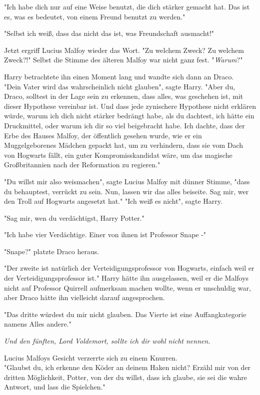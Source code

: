 {"Ich habe dich nur auf eine Weise benutzt, die dich stärker gemacht hat. Das ist es, was es bedeutet, von einem Freund benutzt zu werden."

"Selbst ich weiß, dass das nicht das ist, was Freundschaft ausmacht!"

Jetzt ergriff Lucius Malfoy wieder das Wort. "Zu welchem Zweck? Zu welchem Zweck?!" Selbst die Stimme des älteren Malfoy war nicht ganz fest. "\emph{Warum}?"

Harry betrachtete ihn einen Moment lang und wandte sich dann an Draco.\\ "Dein Vater wird das wahrscheinlich nicht glauben", sagte Harry. "Aber du, Draco, solltest in der Lage sein zu erkennen, dass alles, was geschehen ist, mit dieser Hypothese vereinbar ist. Und dass jede zynischere Hypothese nicht erklären würde, warum ich dich nicht stärker bedrängt habe, als du dachtest, ich hätte ein Druckmittel, oder warum ich dir so viel beigebracht habe. Ich dachte, dass der Erbe des Hauses Malfoy, der öffentlich gesehen wurde, wie er ein Muggelgeborenes Mädchen gepackt hat, um zu verhindern, dass sie vom Dach von Hogwarts fällt, ein guter Kompromisskandidat wäre, um das magische Großbritannien nach der Reformation zu regieren."

"Du willst mir also weismachen", sagte Lucius Malfoy mit dünner Stimme, "dass du behauptest, verrückt zu sein. Nun, lassen wir das alles beiseite. Sag mir, wer den Troll auf Hogwarts angesetzt hat." "Ich weiß es nicht", sagte Harry.

"Sag mir, wen du verdächtigst, Harry Potter."

"Ich habe vier Verdächtige. Einer von ihnen ist Professor Snape -"

"Snape?" platzte Draco heraus.

"Der zweite ist natürlich der Verteidigungsprofessor von Hogwarts, einfach weil er der Verteidigungsprofessor ist." Harry hätte ihn ausgelassen, weil er die Malfoys nicht auf Professor Quirrell aufmerksam machen wollte, wenn er unschuldig war, aber Draco hätte ihn vielleicht darauf angesprochen.

"Das dritte würdest du mir nicht glauben. Das Vierte ist eine Auffangkategorie namens Alles andere."

\emph{Und den fünften, Lord Voldemort, sollte ich dir wohl nicht nennen.}

Lucius Malfoys Gesicht verzerrte sich zu einem Knurren.\\ "Glaubst du, ich erkenne den Köder an deinem Haken nicht? Erzähl mir von der dritten Möglichkeit, Potter, von der du willst, dass ich glaube, sie sei die wahre Antwort, und lass die Spielchen."

}
